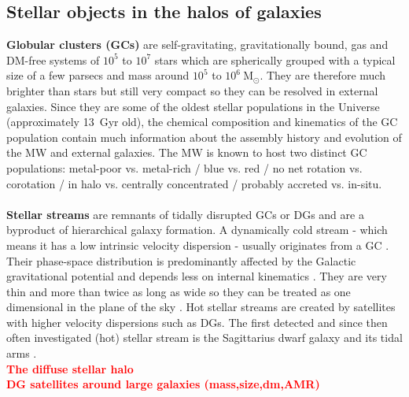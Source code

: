 \subsection{Stellar objects in the halos of galaxies}\label{subsec:halo_objects}
\textbf{Globular clusters (\acp{GC})} are self-gravitating, gravitationally bound, gas and \ac{DM}-free systems of $10^5$ to $10^7$ stars which are spherically grouped with a typical size of a few parsecs and mass around $10^5$ to $10^6\ \mathrm{M}_\odot$. They are therefore much brighter than stars but still very compact so they can be resolved in external galaxies. Since they are some of the oldest stellar populations in the Universe (approximately \SI{13}{Gyr} old), the chemical composition and kinematics of the \ac{GC} population contain much information about the assembly history and evolution of the \ac{MW} and external galaxies. The \ac{MW} is known to host two distinct \ac{GC} populations: metal-poor vs. metal-rich / blue vs. red / no net rotation vs. corotation / in halo vs. centrally concentrated / probably accreted vs. in-situ. \\\\
\textbf{Stellar streams} are remnants of tidally disrupted \acp{GC} or \acp{DG} and are a byproduct of hierarchical galaxy formation. A dynamically cold stream - which means it has a low intrinsic velocity dispersion - usually originates from a \ac{GC} \citep{Bonaca...streamsinfo...2018}. Their phase-space distribution is predominantly affected by the Galactic gravitational potential and depends less on internal kinematics \citep{Kupper...streams...2010, Kupper...streams...2012}. They are very thin and more than twice as long as wide so they can be treated as one dimensional in the plane of the sky \citep{Bonaca...streamsinfo...2018}. Hot stellar streams are created by satellites with higher velocity dispersions such as \acp{DG}. The first detected and since then often investigated (hot) stellar stream is the Sagittarius dwarf galaxy and its tidal arms \citep{Ibata...Sagittarius....1994}.\\
\textbf{\textcolor{red}{The diffuse stellar halo}}\\
\textbf{\textcolor{red}{DG satellites around large galaxies (mass,size,dm,AMR)}}
